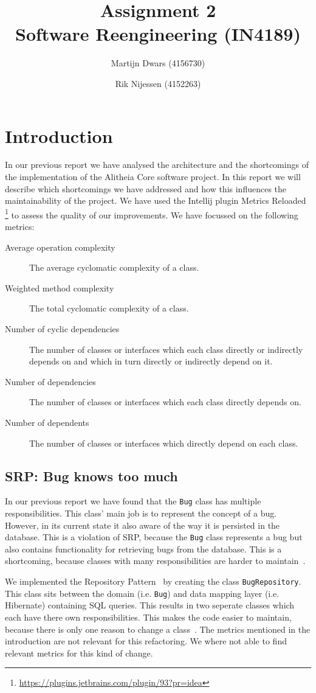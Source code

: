\documentclass{article}
\author{Martijn Dwars (4156730) \and Rik Nijessen (4152263)}
\title{Assignment 2 \\ Software Reengineering (IN4189)}
\begin{document}
\maketitle

\section{Introduction}
In our previous report we have analysed the architecture and the shortcomings of the implementation of the Alitheia Core software project. In this report we will describe which shortcomings we have addressed and how this influences the maintainability of the project.
We have used the Intellij plugin Metrics Reloaded \footnote{\url{https://plugins.jetbrains.com/plugin/93?pr=idea}} to assess the quality of our improvements. We have focussed on the following metrics:
\begin{description}
\item[Average operation complexity] The average cyclomatic complexity of a class.
\item[Weighted method complexity] The total cyclomatic complexity of a class.
\item[Number of cyclic dependencies]  The number of classes or interfaces which each class directly or indirectly depends on and which in turn directly or indirectly depend on it. 
\item[Number of dependencies] The number of classes or interfaces which each class directly depends on.
\item[Number of dependents] The number of classes or interfaces which directly depend on each class.
\end{description}

\subsection{SRP: Bug knows too much}
In our previous report we have found that the \verb|Bug| class has multiple responsibilities. This class' main job is to represent the concept of a bug. However, in its current state it also aware of the way it is persisted in the database.
This is a violation of SRP, because the \verb|Bug| class represents a bug but also contains functionality for retrieving bugs from the database. This is a shortcoming, because classes with many responsibilities are harder to maintain~\cite{martin2003agile}.

We implemented the Repository Pattern~\cite{repository} by creating the class \texttt{BugRepository}. This class sits between the domain (i.e. \verb|Bug|) and data mapping layer (i.e. Hibernate) containing SQL queries.
This results in two seperate classes which each have there own responsibilities. This makes the code easier to maintain, because there is only one reason to change a class~\cite{martin2003agile}.
The metrics mentioned in the introduction are not relevant for this refactoring. We where not able to find relevant metrics for this kind of change.
\end{document}
